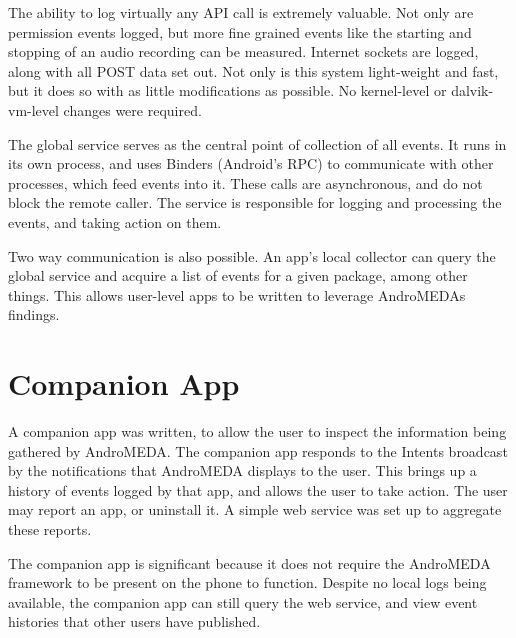The ability to log virtually any API call is extremely valuable. Not only are permission events logged, but more fine grained events like the starting and stopping of an audio recording can be measured. Internet sockets are logged, along with all POST data set out. Not only is this system light-weight and fast, but it does so with as little modifications as possible. No kernel-level or dalvik-vm-level changes were required.

The global service serves as the central point of collection of all events. It runs in its own process, and uses Binders (Android's RPC) to communicate with other processes, which feed events into it. These calls are asynchronous, and do not block the remote caller. The service is responsible for logging and processing the events, and taking action on them.

Two way communication is also possible. An app's local collector can query the global service and acquire a list of events for a given package, among other things. This allows user-level apps to be written to leverage AndroMEDAs findings.

\section{Companion App}
A companion app was written, to allow the user to inspect the information being gathered by AndroMEDA. The companion app responds to the Intents broadcast by the notifications that AndroMEDA displays to the user. This brings up a history of events logged by that app, and allows the user to take action. The user may report an app, or uninstall it. A simple web service was set up to aggregate these reports.

The companion app is significant because it does not require the AndroMEDA framework to be present on the phone to function. Despite no local logs being available, the companion app can still query the web service, and view event histories that other users have published.
